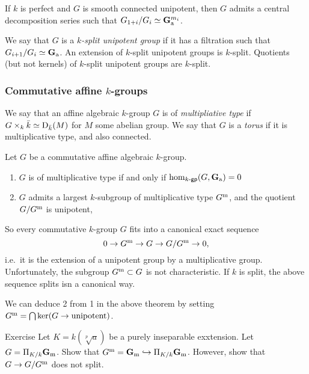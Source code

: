 \begin{coro}
If $k$ is perfect and $G$ is smooth connected unipotent, then $G$ admits a 
central decomposition series such that $G_{1+i}/G_i \simeq \mathbf{G}_{\mathrm{a}}^{m_i}$. 
\end{coro}

We say that $G$ is a \emph{$k$-split unipotent group} if it has a filtration 
such that $G_{i+1}/G_i\simeq \mathbf{G}_{\mathrm{a}}$. An extension of $k$-split 
unipotent groups is $k$-split. Quotients (but not kernels) of $k$-split 
unipotent groups are $k$-split. 


\subsubsection{Commutative affine $k$-groups}

We say that an affine algebraic $k$-group $G$ is of \emph{multipliative type} 
if $G\times_k \bar k\simeq \operatorname{D}_{\bar k}(M)$ for $M$ some abelian 
group. We say that $G$ is a \emph{torus} if it is multiplicative type, and also 
connected. 

\begin{theo}
Let $G$ be a commutative affine algebraic $k$-group. 
\begin{enumerate}
  \item $G$ is of multiplicative type if and only if $\hom_{k\textnormal{-}\mathsf{gp}}(G,\mathbf{G}_{\mathrm{a}})=0$ 
  \item $G$ admits a largest $k$-subgroup of multiplicative type $G^{\mathrm{m}}$, and 
    the quotient $G/G^{\mathrm{m}}$ is unipotent, 
\end{enumerate}
\end{theo}

So every commutative $k$-group $G$ fits into a canonical exact sequence 
\[
  0 \to G^{\mathrm{m}} \to G \to G/G^{\mathrm{m}} \to 0 ,
\]
i.e.\ it is the extension of a unipotent group by a multiplicative group. 
Unfortunately, the subgroup $G^{\mathrm{m}}\subset G$ is not characteristic. If $k$ 
is split, the above sequence splits isn a canonical way. 

We can deduce 2 from 1 in the above theorem by setting 
$G^{\mathrm{m}}=\bigcap \ker(G\to \text{unipotent})$. 

\begin{enonce}[remark]{Exercise}
Let $K=k(\sqrt[p] a)$ be a purely inseparable exxtension. Let 
$G=\Pi_{K/k}\mathbf{G}_{\mathrm{m}}$. Show that $G^{\mathrm{m}} = \mathbf{G}_{\mathrm{m}} \hookrightarrow \Pi_{K/k} \mathbf{G}_{\mathrm{m}}$. However, show that $G\to G/G^{\mathrm{m}}$ does not split. 
\end{enonce}

